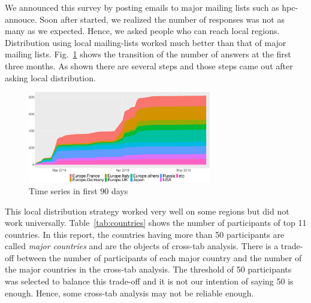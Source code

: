 \documentclass[conference,10pt,letterpaper]{IEEEtran}
\begin{document}
%
%
We announced this survey by posting emails to major mailing lists such
as hpc-annouce. Soon after started, we realized the number of
responses was not as many as we expected. Hence, we asked people who can
reach local regions. Distribution using local mailing-lists worked
much better than that of major mailing
lists. Fig.~\ref{fig:time-series} shows the transition of the number
of answers at the first three months. As shown there are several steps
and those steps came out after asking local distribution. 

\begin{figure}[htb]
\begin{center}
\includegraphics[width=8cm]{R-scripts/TimeSeries.pdf}
\caption{Time series in first 90 days}
\label{fig:time-series}
\end{center}
\end{figure}

This local distribution strategy worked very well on some regions but
did not work universally. Table~\ref{tab:countries} shows the number
of participants of top 11 countries. In this report, the
countries having more than 50 participants are called {\it major
  countries} and are the objects of cross-tab analysis. There is a
trade-off between the number of participants of each major country
and the number of the major countries in the cross-tab analysis. The
threshold of 50 participants was selected to balance this trade-off
and it is not our intention of saying 50 is enough. Hence, some cross-tab
analysis may not be reliable enough.
\end{document}
